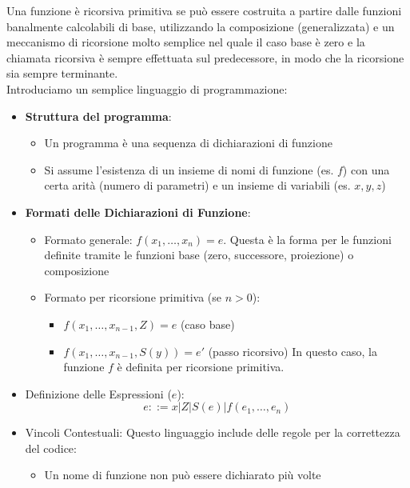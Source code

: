 \documentclass[12pt, a4paper]{report}
\begin{document}
                Una funzione è ricorsiva primitiva se può essere costruita a partire dalle funzioni banalmente calcolabili di base, utilizzando la composizione (generalizzata) e un meccanismo di ricorsione molto semplice nel quale il caso base è zero e la chiamata ricorsiva è sempre effettuata sul predecessore, in modo che la ricorsione sia sempre terminante.\\
                Introduciamo un semplice linguaggio di programmazione:
                \begin{itemize}
                    \item \textbf{Struttura del programma}: \begin{itemize}
                        \item Un programma è una sequenza di dichiarazioni di funzione
                        \item Si assume l'esistenza di un insieme di nomi di funzione (es. $f$) con una certa arità (numero di parametri) e un insieme di variabili (es. $x, y, z$)
                    \end{itemize}
                    \item \textbf{Formati delle Dichiarazioni di Funzione}: \begin{itemize}
                        \item Formato generale: $f(x_1, \ldots, x_n) = e$. Questa è la forma per le funzioni definite tramite le funzioni base (zero, successore, proiezione) o composizione
                        \item Formato per ricorsione primitiva (se $n>0$): \begin{itemize}
                            \item $f(x_1, \ldots, x_{n-1}, Z) = e$ (caso base)
                            \item $f(x_1, \ldots, x_{n-1}, S(y)) = e'$ (passo ricorsivo) In questo caso, la funzione $f$ è definita per ricorsione primitiva.
                        \end{itemize}
                    \end{itemize}
                    \item Definizione delle Espressioni ($e$): $$e::=x|Z|S(e)|f(e_1,\ldots,e_n)$$
                    \item Vincoli Contestuali: Questo linguaggio include delle regole per la correttezza del codice: \begin{itemize}
                        \item Un nome di funzione non può essere dichiarato più volte

\end{itemize}
\end{itemize}
\end{document}
